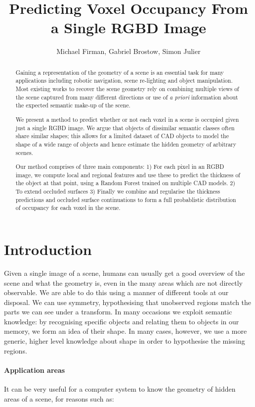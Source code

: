 \documentclass[10pt,twocolumn,letterpaper]{article}
\title{Predicting Voxel Occupancy From a Single RGBD Image}
\author{Michael Firman, Gabriel Brostow, Simon Julier \ea}
\begin{document}
\maketitle

\begin{abstract}
	Gaining a representation of the geometry of a scene is an essential task for many applications including robotic navigation, scene re-lighting and object manipulation. 
	Most existing works to recover the scene geometry rely on combining multiple views of the scene captured from many different directions or use of \emph{a priori} information about the expected semantic make-up of the scene.

	We present a method to predict whether or not each voxel in a scene is occupied given just a single RGBD image.
	We argue that objects of dissimilar semantic classes often share similar shapes; this allows for a limited dataset of CAD objects to model the shape of a wide range of objects and hence estimate the hidden geometry of arbitrary scenes.

	Our method comprises of three main components:
	1) For each pixel in an RGBD image, we compute local and regional features and use these to predict the thickness of the object at that point, using a Random Forest trained on multiple CAD models.
	2) To extend occluded surfaces
	3) Finally we combine and regularise the thickness predictions and occluded surface continuations to form a full probablistic distribution of occupancy for each voxel in the scene.
\end{abstract}


\section{Introduction}
Given a single image of a scene, humans can usually get a good overview of the scene and what the geometry is, even in the many areas which are not directly observable. 
We are able to do this using a manner of different tools at our disposal. 
We can use symmetry, hypothesising that unobserved regions match the parts we can see under a transform.
In many occasions we exploit semantic knowledge: by recognising specific objects and relating them to objects in our memory, we form an idea of their shape.
In many cases, however, we use a more generic, higher level knowledge about shape in order to hypothesise the missing regions.


\paragraph{Application areas}
It can be very useful for a computer system to know the geometry of hidden areas of a scene, for reasons such as:
\end{document}
